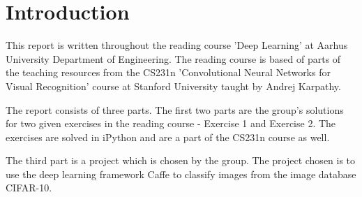 \graphicspath{{Chapters/Introduction/}}

\chapter{Introduction}

This report is written throughout the reading course 'Deep Learning' at Aarhus University Department of Engineering. The reading course is based of parts of the teaching resources from the CS231n 'Convolutional Neural Networks for Visual Recognition' course at Stanford University taught by Andrej Karpathy. 

The report consists of three parts. The first two parts are the group's solutions for two given exercises in the reading course - Exercise 1 and Exercise 2. The exercises are solved in iPython and are a part of the CS231n course as well.

The third part is a project which is chosen by the group. The project chosen is to use the deep learning framework Caffe to classify images from the image database CIFAR-10.